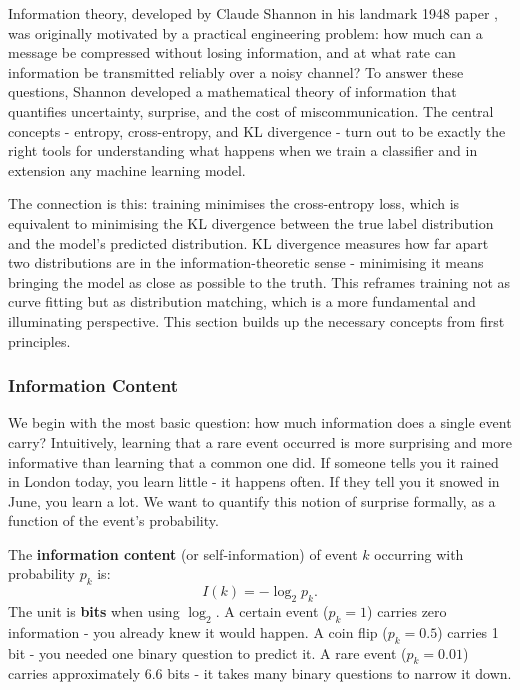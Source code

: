 Information theory, developed by Claude Shannon in his landmark 1948 paper \parencite{Shannon1948}, was originally motivated by a practical engineering problem: how much can a message be compressed without losing information, and at what rate can information be transmitted reliably over a noisy channel? To answer these questions, Shannon developed a mathematical theory of information that quantifies uncertainty, surprise, and the cost of miscommunication. The central concepts - entropy, cross-entropy, and KL divergence - turn out to be exactly the right tools for understanding what happens when we train a classifier and in extension any machine learning model.

The connection is this: training minimises the cross-entropy loss, which is equivalent to minimising the KL divergence between the true label distribution and the model's predicted distribution. KL divergence measures how far apart two distributions are in the information-theoretic sense - minimising it means bringing the model as close as possible to the truth. This reframes training not as curve fitting but as distribution matching, which is a more fundamental and illuminating perspective. This section builds up the necessary concepts from first principles.

\subsubsection{Information Content}

We begin with the most basic question: how much information does a single event carry? Intuitively, learning that a rare event occurred is more surprising and more informative than learning that a common one did. If someone tells you it rained in London today, you learn little - it happens often. If they tell you it snowed in June, you learn a lot. We want to quantify this notion of surprise formally, as a function of the event's probability.

The \textbf{information content} (or self-information) of event $k$ occurring with probability $p_k$ is:
\begin{equation}
    I(k) = -\log_2 p_k.
\end{equation}
The unit is \textbf{bits} when using $\log_2$. A certain event ($p_k = 1$) carries zero information - you already knew it would happen. A coin flip ($p_k = 0.5$) carries 1 bit - you needed one binary question to predict it. A rare event ($p_k = 0.01$) carries approximately 6.6 bits - it takes many binary questions to narrow it down.

